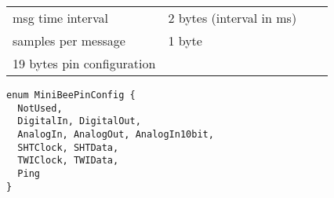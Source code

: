 \documentclass[letterpaper,10pt]{article}
\begin{document}
\begin{center}
\begin{tabular}{llll}
msg time interval & 2 bytes (interval in ms) & & \\
samples per message & 1 byte & & \\
19 bytes pin configuration& & \\
\end{tabular}
\end{center}

\begin{verbatim}
enum MiniBeePinConfig { 
  NotUsed,
  DigitalIn, DigitalOut,
  AnalogIn, AnalogOut, AnalogIn10bit, 
  SHTClock, SHTData, 
  TWIClock, TWIData,
  Ping
}
\end{verbatim} 
% 
\end{document}
